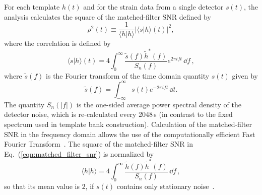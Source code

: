 For each template $h(t)$ and for the strain data from a single detector
$s(t)$, the analysis calculates the square of the matched-filter SNR defined
by~\cite{Allen:2005fk}
\begin{equation}
  \label{eqn:matched_filter_snr}
  \rho^2(t) \equiv \frac{1}{\langle h | h \rangle} \left| \langle s | h \rangle(t) \right|^2,
\end{equation}
where the correlation is defined by 
\begin{equation}
 \langle s|h\rangle(t) = 4 \int^\infty_0 \frac{\tilde{s}(f)\tilde{h}^*(f)}{S_n(f)} e^{2\pi i ft}\,\dd f\,,
 \label{eqn:matched_filter_innerprod}
\end{equation}
where $\tilde{s}(f)$ is the Fourier transform of the time domain quantity $s(t)$
given by
\begin{equation}
\tilde{s}(f) = \int_{-\infty}^{\infty} s(t) e^{-2\pi ift}\,\dd t.
\end{equation}
The quantity $S_n(|f|)$ is the one-sided average power spectral density of the
detector noise, which is re-calculated every 2048\,s (in contrast to the fixed
spectrum used in template bank construction).  Calculation of the
matched-filter SNR in the frequency domain allows the use of the
computationally efficient Fast Fourier Transform~\cite{intel-mkl,FFTW05}.  The
square of the matched-filter SNR in Eq.~(\ref{eqn:matched_filter_snr}) is
normalized by
\begin{equation}
 \langle h|h\rangle = 4 \int^\infty_0 \frac{\tilde{h}(f)\tilde{h}^*(f)}{S_n(f)} \,\dd f\,,
 \label{eqn:matched_filter_norm}
\end{equation}
so that its mean value is $2$, if $s(t)$ contains only stationary
noise~\cite{Cutler:1994}.

